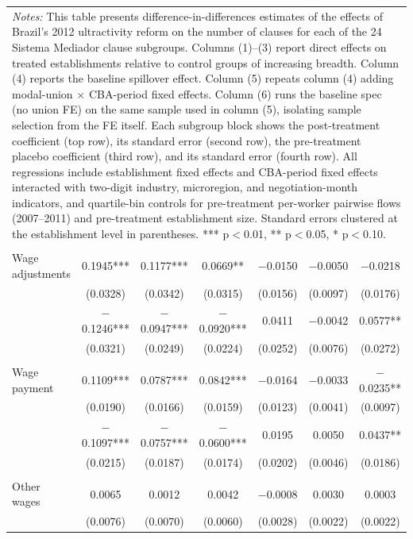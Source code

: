 \documentclass[12pt,letterpaper]{article}
\begin{document}
\begin{longtable}{l cccccc}
\multicolumn{7}{p{\linewidth}}{\scriptsize\textit{Notes:} This table presents difference-in-differences estimates of the effects of Brazil's 2012 ultractivity reform on the number of clauses for each of the 24 Sistema Mediador clause subgroups. Columns (1)--(3) report direct effects on treated establishments relative to control groups of increasing breadth. Column (4) reports the baseline spillover effect. Column (5) repeats column (4) adding modal-union $\times$ CBA-period fixed effects. Column (6) runs the baseline spec (no union FE) on the same sample used in column (5), isolating sample selection from the FE itself. Each subgroup block shows the post-treatment coefficient (top row), its standard error (second row), the pre-treatment placebo coefficient (third row), and its standard error (fourth row). All regressions include establishment fixed effects and CBA-period fixed effects interacted with two-digit industry, microregion, and negotiation-month indicators, and quartile-bin controls for pre-treatment per-worker pairwise flows (2007--2011) and pre-treatment establishment size. Standard errors clustered at the establishment level in parentheses. *** p$<$0.01, ** p$<$0.05, * p$<$0.10.} \\
\endlastfoot
\midrule
\multicolumn{7}{l}{\textit{Wage amenities}} \\
\quad Wage adjustments & 0.1945*** & 0.1177*** & 0.0669** & $-$0.0150 & $-$0.0050 & $-$0.0218 \\
  & (0.0328) & (0.0342) & (0.0315) & (0.0156) & (0.0097) & (0.0176) \\
  & $-$0.1246*** & $-$0.0947*** & $-$0.0920*** & 0.0411 & $-$0.0042 & 0.0577** \\
  & (0.0321) & (0.0249) & (0.0224) & (0.0252) & (0.0076) & (0.0272) \\
 & & & & & & \\
\quad Wage payment & 0.1109*** & 0.0787*** & 0.0842*** & $-$0.0164 & $-$0.0033 & $-$0.0235** \\
  & (0.0190) & (0.0166) & (0.0159) & (0.0123) & (0.0041) & (0.0097) \\
  & $-$0.1097*** & $-$0.0757*** & $-$0.0600*** & 0.0195 & 0.0050 & 0.0437** \\
  & (0.0215) & (0.0187) & (0.0174) & (0.0202) & (0.0046) & (0.0186) \\
 & & & & & & \\
\quad Other wages & 0.0065 & 0.0012 & 0.0042 & $-$0.0008 & 0.0030 & 0.0003 \\
  & (0.0076) & (0.0070) & (0.0060) & (0.0028) & (0.0022) & (0.0022) \\

\end{longtable}
\end{document}
